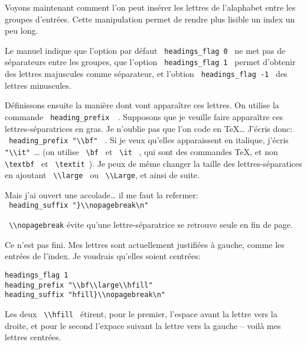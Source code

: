Voyons maintenant comment l'on peut insérer les lettres de l'alaphabet entre les groupes d'entrées. Cette manipulation permet de rendre plus lisible un index un peu long. 

Le manuel indique que l'option par défaut \verb+ headings_flag 0 + ne met pas de séparateurs entre les groupes, que l'option \verb+ headings_flag 1 + permet d'obtenir des lettres majuscules comme séparateur, et l'obtion  \verb+ headings_flag -1 + des lettres minuscules.

Définissons ensuite la manière dont vont apparaître ces lettres. On utilise la commande \verb| heading_prefix  |. Supposons que je veuille faire apparaître ces lettres-séparatrices en gras. Je n'oublie pas que l'on code en \TeX … J'écris donc:\\
\verb| heading_prefix "\\bf" | . Si je veux qu'elles apparaissent en italique, j'écris \verb| "\\it" |… (on utilise \verb+ \bf + et \verb+ \it + , qui sont des commandes \TeX, et non \verb+ \textbf + et \verb+ \textit +).
Je peux de même changer la taille des lettres-séparatices en ajoutant \verb| \\large | ou \verb| \\Large|, et ainsi de suite. 

Mais j'ai ouvert une accolade… il me faut la refermer:\\
\verb| heading_suffix "}\\nopagebreak\n" |

\verb| \\nopagebreak| évite qu'une lettre-séparatrice se retrouve seule en fin de page. 


Ce n'est pas fini. Mes lettres sont actuellement justifiées à gauche, comme les entrées de l'index. Je voudrais qu'elles soient centrées: \\

\begin{verbatim}
headings_flag 1
heading_prefix "\\bf\\large\\hfill" 
heading_suffix "hfill}\\nopagebreak\n" 
\end{verbatim}
Les deux \verb| \\hfill | étirent, pour le premier, l'espace avant la lettre vers la droite, et pour le second l'expace suivant la lettre vers la gauche -- voilà mes lettres centrées.

